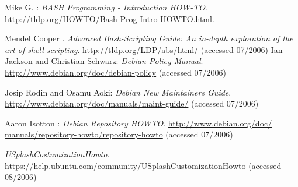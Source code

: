 
\bigskip{\par}
\backmatter
{}
\begin{thebibliography}{99}
 Mike G. : \newblock \emph{BASH %
	Programming - Introduction HOW-TO}. \href{http://tldp.org/HOWTO/Bash-Prog%
	-Intro-HOWTO.html}{http://tldp.org/HOWTO/Bash-Prog-Intro-HOWTO.html}.

 Mendel Cooper . \newblock
	\emph{Advanced Bash-Scripting Guide: An in-depth exploration of the %
	art of shell scripting}. \href{http://tldp.org/LDP/abs/html/}%
	{http://tldp.org/LDP/abs/html/} (accessed 07/2006)
 Ian Jackson and Christian Schwarz: \newblock
	\emph{Debian Policy Manual}.
	\href{http://www.debian.org/doc/debian-policy}%
	{http://www.debian.org/doc/debian-policy} (accessed 07/2006)

 Josip Rodin and Osamu Aoki: \newblock
	\emph{Debian New Maintainers Guide}.
	\href{http://www.debian.org/doc/manuals/maint-guide/}%
	{http://www.debian.org/doc/manuals/maint-guide/} (accessed 07/2006)

 Aaron Isotton :
	\newblock \emph{Debian Repository HOWTO}. \href{http://www.debian.org/doc/%
	manuals/repository-howto/repository-howto}{http://www.debian.org/doc/%
	manuals/repository-howto/repository-howto} (accessed 07/2006)

 \emph{USplashCostumizationHowto}.\\
	\href{https://help.ubuntu.com/community/USplashCustomizationHowto}
		{https://help.ubuntu.com/community/USplashCustomizationHowto}
	(accessed 08/2006)

\end{thebibliography}
